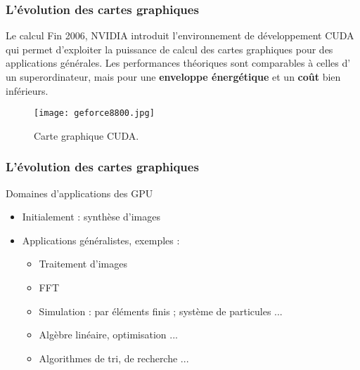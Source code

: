 \begin{frame}
  \frametitle{L'évolution des cartes graphiques}
\begin{block}{Le calcul}
    Fin 2006, NVIDIA introduit l'environnement de développement CUDA qui
    permet d'exploiter la puissance de calcul des cartes graphiques pour des applications générales.
    Les performances théoriques sont comparables à celles d' un 
    superordinateur, mais  pour une {\bf enveloppe énergétique} et un {\bf coût} bien inférieurs.

    \begin{figure}[htbp]
        \centering
       \texttt{[image: geforce8800.jpg]} 
        \caption{Carte graphique CUDA.}
        \label{fig:gforce8}
    \end{figure}
\end{block}
\end{frame}

\begin{frame}
  \frametitle{L'évolution des cartes graphiques}
\begin{block}{Domaines d'applications des GPU}
 \begin{itemize}
    \item Initialement : synthèse d'images
    \item Applications généralistes, exemples :
     \begin{itemize}
        \item Traitement d'images
        \item FFT
        \item Simulation : par éléments finis ; système de particules ...
        \item Algèbre linéaire, optimisation ...
        \item Algorithmes de tri, de recherche ...
    \end{itemize}
\end{itemize}   
\end{block}
\end{frame}

